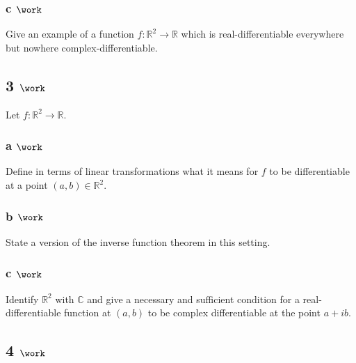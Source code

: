 \hypertarget{c-work}{%
\subsubsection{\texorpdfstring{c
\(\work\)}{c \textbackslash work}}\label{c-work}}

Give an example of a function \(f: {\mathbb{R}}^2 \to {\mathbb{R}}\)
which is real-differentiable everywhere but nowhere
complex-differentiable.

\hypertarget{work-11}{%
\subsection{\texorpdfstring{3
\(\work\)}{3 \textbackslash work}}\label{work-11}}

Let \(f:{\mathbb{R}}^2\to {\mathbb{R}}\).

\hypertarget{a-work-1}{%
\subsubsection{\texorpdfstring{a
\(\work\)}{a \textbackslash work}}\label{a-work-1}}

Define in terms of linear transformations what it means for \(f\) to be
differentiable at a point \((a, b) \in {\mathbb{R}}^2\).

\hypertarget{b-work-1}{%
\subsubsection{\texorpdfstring{b
\(\work\)}{b \textbackslash work}}\label{b-work-1}}

State a version of the inverse function theorem in this setting.

\hypertarget{c-work-1}{%
\subsubsection{\texorpdfstring{c
\(\work\)}{c \textbackslash work}}\label{c-work-1}}

Identify \({\mathbb{R}}^2\) with \({\mathbb{C}}\) and give a necessary
and sufficient condition for a real-differentiable function at
\((a, b)\) to be complex differentiable at the point \(a+ib\).

\hypertarget{work-12}{%
\subsection{\texorpdfstring{4
\(\work\)}{4 \textbackslash work}}\label{work-12}}

